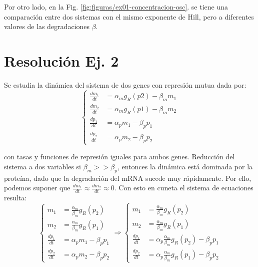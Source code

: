 \documentclass[twocolumn,aps,prl]{revtex4-1}
\newcommand*\sepline{%
  \begin{center} 
    \rule[1ex]{.5\textwidth}{.5pt}
  \end{center}}
\begin{document}
Por otro lado, en la Fig. \ref{fig:figuras/ex01-concentracion-osc}. se tiene una comparación entre dos sistemas con el mismo exponente de Hill, pero a diferentes valores de las degradaciones $\beta$.


\section{Resolución Ej. 2}


Se estudia la dinámica del sistema de dos genes con represión mutua dada por:
$$\left\lbrace
\begin{aligned}
\frac{d m_{1}}{dt} &= \alpha_{m} g_{R}(p 2)-\beta_{m} m_{1} \\
\frac{d m_{2}}{dt} &= \alpha_{m} g_{R}(p 1)-\beta_{m} m_{2} \\
\frac{d p_{1}}{dt} &= \alpha_{p} m_{1}-\beta_{p} p_{1} \\
\frac{d p_{2}}{dt} &= \alpha_{p} m_{2}-\beta_{p} p_{2}
\end{aligned}\right.
$$

con tasas y funciones de represión iguales para ambos genes.
Reducción del sistema a dos variables
si $\beta_{m}>>\beta_{p}$, entonces la dinámica está dominada por la proteína, dado que la degradación del mRNA sucede muy rápidamente. Por ello, podemos suponer que $\frac{dm_1}{dt} \approx \frac{dm_2}{dt} \approx 0 .$ Con esto en cuneta el sistema de ecuaciones resulta:
$$\left\lbrace
\begin{aligned}
  m_{1} &=\frac{\alpha_{m}}{\beta_{m}} g_{R}\left(p_{2}\right) \\
  m_{2} &=\frac{\alpha_{m}}{\beta_{m}} g_{R}\left(p_{1}\right) \\
  \frac{dp_{1}}{dt} &= \alpha_{p} m_{1}-\beta_{p} p_{1} \\
  \frac{dp_{2}}{dt} &= \alpha_{p} m_{2}-\beta_{p} p_{2}
\end{aligned}\right.
\Rightarrow
\left\lbrace
\begin{aligned}
  m_{1} &=\frac{\alpha_{m}}{\beta_{m}} g_{R}\left(p_{2}\right) \\
  m_{2} &=\frac{\alpha_{m}}{\beta_{m}} g_{R}\left(p_{1}\right) \\
  \frac{dp_{1}}{dt} &=\alpha_{p} \frac{\alpha_{m}}{\beta_{m}} g_{R}\left(p_{2}\right)-\beta_{p} p_{1} \\
  \frac{dp_{2}}{dt} &=\alpha_{p} \frac{\alpha_{m}}{\beta_{m}} g_{R}\left(p_{1}\right)-\beta_{p} p_{2}
\end{aligned}\right.
$$
\end{document}
